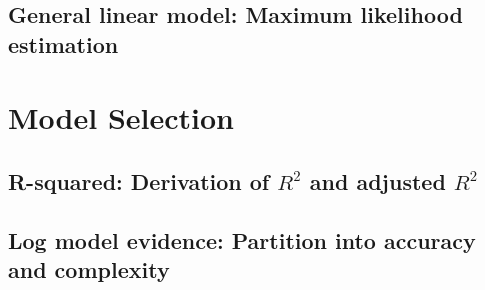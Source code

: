 \documentclass[a4paper,12pt]{book}
\begin{document}
\section{General linear model: Maximum likelihood estimation}
\label{sec:glm-mle}



\chapter{Model Selection} \newpage

\section{R-squared: Derivation of $R^2$ and adjusted $R^2$}
\label{sec:rsq-der}


\section{Log model evidence: Partition into accuracy and complexity}
\label{sec:lme-anc}

\end{document}
